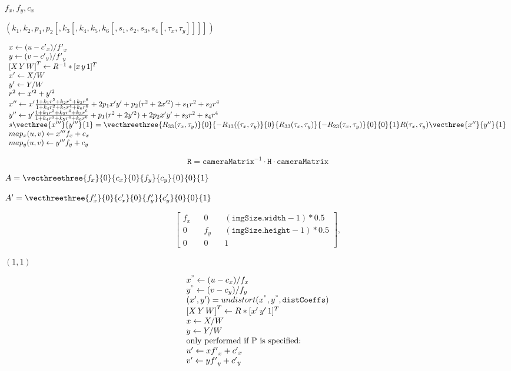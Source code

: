 \documentclass{article}
\begin{document}
$f_x, f_y, c_x$
\pagebreak

$(k_1, k_2, p_1, p_2[, k_3[, k_4, k_5, k_6[, s_1, s_2, s_3, s_4[, \tau_x, \tau_y]]]])$
\pagebreak

\[ \begin{array}{l} x \leftarrow (u - {c'}_x)/{f'}_x \\ y \leftarrow (v - {c'}_y)/{f'}_y \\ {[X\,Y\,W]} ^T \leftarrow R^{-1}*[x \, y \, 1]^T \\ x' \leftarrow X/W \\ y' \leftarrow Y/W \\ r^2 \leftarrow x'^2 + y'^2 \\ x'' \leftarrow x' \frac{1 + k_1 r^2 + k_2 r^4 + k_3 r^6}{1 + k_4 r^2 + k_5 r^4 + k_6 r^6} + 2p_1 x' y' + p_2(r^2 + 2 x'^2) + s_1 r^2 + s_2 r^4\\ y'' \leftarrow y' \frac{1 + k_1 r^2 + k_2 r^4 + k_3 r^6}{1 + k_4 r^2 + k_5 r^4 + k_6 r^6} + p_1 (r^2 + 2 y'^2) + 2 p_2 x' y' + s_3 r^2 + s_4 r^4 \\ s\vecthree{x'''}{y'''}{1} = \vecthreethree{R_{33}(\tau_x, \tau_y)}{0}{-R_{13}((\tau_x, \tau_y)} {0}{R_{33}(\tau_x, \tau_y)}{-R_{23}(\tau_x, \tau_y)} {0}{0}{1} R(\tau_x, \tau_y) \vecthree{x''}{y''}{1}\\ map_x(u,v) \leftarrow x''' f_x + c_x \\ map_y(u,v) \leftarrow y''' f_y + c_y \end{array} \]
\pagebreak

\[\texttt{R} = \texttt{cameraMatrix} ^{-1} \cdot \texttt{H} \cdot \texttt{cameraMatrix}\]
\pagebreak

$A=\vecthreethree{f_x}{0}{c_x}{0}{f_y}{c_y}{0}{0}{1}$
\pagebreak

$A'=\vecthreethree{f_x'}{0}{c_x'}{0}{f_y'}{c_y'}{0}{0}{1}$
\pagebreak

\[\begin{bmatrix} f_x && 0 && ( \texttt{imgSize.width} -1)*0.5 \\ 0 && f_y && ( \texttt{imgSize.height} -1)*0.5 \\ 0 && 0 && 1 \end{bmatrix} ,\]
\pagebreak

$(1,1)$
\pagebreak

\[ \begin{array}{l} x^{"} \leftarrow (u - c_x)/f_x \\ y^{"} \leftarrow (v - c_y)/f_y \\ (x',y') = undistort(x^{"},y^{"}, \texttt{distCoeffs}) \\ {[X\,Y\,W]} ^T \leftarrow R*[x' \, y' \, 1]^T \\ x \leftarrow X/W \\ y \leftarrow Y/W \\ \text{only performed if P is specified:} \\ u' \leftarrow x {f'}_x + {c'}_x \\ v' \leftarrow y {f'}_y + {c'}_y \end{array} \]
\pagebreak
\end{document}
